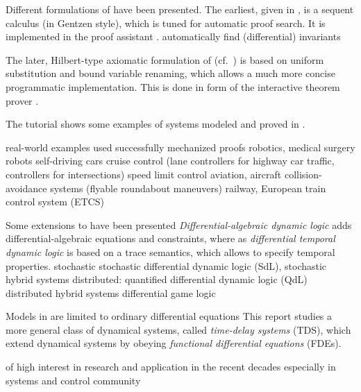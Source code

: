     Different formulations of \dL have been presented.
    The earliest, given in \cite{Platzer10HybridSystems}, is a sequent calculus (in Gentzen style), which is tuned for automatic proof search. It is implemented in the proof assistant \KeYmaera.
    automatically find (differential) invariants

    The later, Hilbert-type axiomatic formulation of \dL (cf.~\cite{Platzer15Uniform,Platzer12Complete,Platzer12LogicsDynSys}) is based on uniform substitution and bound variable renaming, which allows a much more concise programmatic implementation. This is done in form of the interactive theorem prover \KeYmaeraX.

    The tutorial \cite{Quesel16Tutorial} shows some examples of systems modeled and proved in \dL.
    
    real-world examples
    used successfully mechanized proofs
    robotics, medical surgery robots \cite{Kouskoulas13SurgicalRobot}
    self-driving cars 
    cruise control \cite{Loos11CruiseControl,Loos13CruiseControllers}
    (lane controllers for highway car traffic, controllers for intersections)
    speed limit control
    aviation, aircraft collision-avoidance systems \cite{Jeannin15CollisonAvoidance}
    (flyable roundabout maneuvers)
    railway, European train control system (ETCS) \cite{Platzer09ETCS}

    Some extensions to \dL have been presented
    \emph{Differential-algebraic dynamic logic} \DAL adds differential-algebraic equations and constraints, where as
    \emph{differential temporal dynamic logic} \dTL is based on a trace semantics, which allows to specify temporal properties.
    stochastic
    stochastic differential dynamic logic (SdL), stochastic hybrid systems
    distributed: quantified differential dynamic logic (QdL)
    distributed hybrid systems
    differential game logic \dGL \cite{Platzer15GameLogic}





    Models in \dL are limited to ordinary differential equations
    This report studies a more general class of dynamical systems, called \emph{time-delay systems} (TDS), which extend dynamical systems by obeying \emph{functional differential equations} (FDEs). 

        of high interest in research and application in the recent decades
    especially in systems and control community

